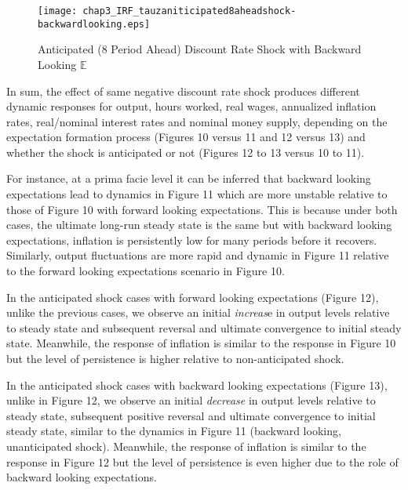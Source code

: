 \documentclass[12pt]{article}
\newcommand{\1}{\mathbbm 1}
\begin{document}
\begin{figure}[H]
	\begin{center}
		\texttt{[image: chap3\_IRF\_tauzaniticipated8aheadshock-backwardlooking.eps]}
	\end{center}
	\caption{Anticipated (8 Period Ahead) Discount Rate Shock with Backward Looking $\mathbb{E}$}
\end{figure}


In sum, the effect of same negative discount rate shock produces different dynamic responses for output, hours worked, real wages, annualized inflation rates, real/nominal interest rates and nominal money supply, depending on the expectation formation process (Figures 10 versus 11 and 12 versus 13) and whether the shock is anticipated or not (Figures 12 to 13 versus 10 to 11). 


For instance, at a prima facie level it can be inferred that backward looking expectations lead to dynamics in Figure 11 which are more unstable relative to those of Figure 10 with forward looking expectations. This is because under both cases, the ultimate long-run steady state is the same but with backward looking expectations, inflation is persistently low for many periods before it recovers. Similarly, output fluctuations are more rapid and dynamic in Figure 11 relative to the forward looking expectations scenario in Figure 10.

In the anticipated shock cases with forward looking expectations (Figure 12), unlike the previous cases, we observe an initial \textit{increas}e in output levels relative to steady state and subsequent reversal and ultimate convergence to initial steady state. Meanwhile, the response of inflation is similar to the response in Figure 10 but the level of persistence is higher relative to non-anticipated shock. 




In the anticipated shock cases with backward looking expectations (Figure 13), unlike in Figure 12, we observe an initial \textit{decrease} in output levels relative to steady state, subsequent positive reversal and ultimate convergence to initial steady state, similar to the dynamics in Figure 11 (backward looking, unanticipated shock). Meanwhile, the response of inflation is similar to the response in Figure 12 but the level of persistence is even higher due to the role of backward looking expectations.
\end{document}
